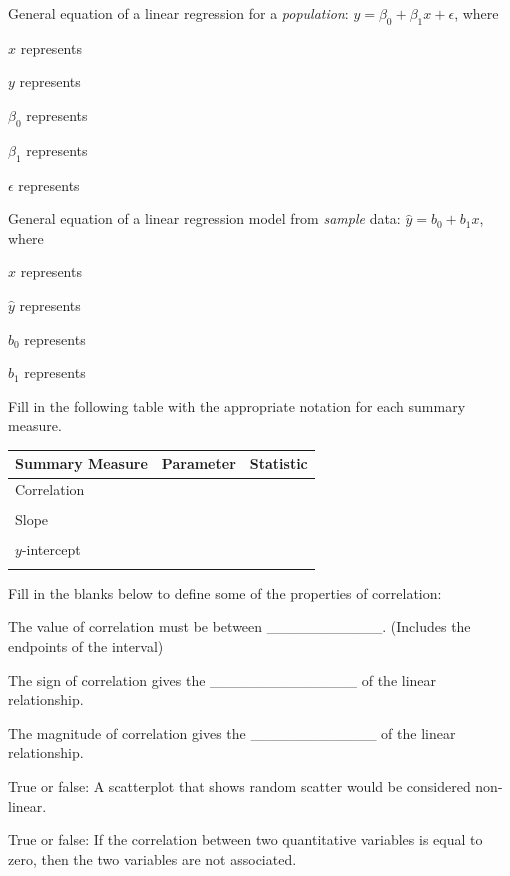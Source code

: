 \documentclass[
]{report}
\newcommand{\rgs}{\vspace{12pt}} %
\newcommand{\rgi}{\hspace{24pt}}  %
\begin{document}
General equation of a linear regression for a \emph{population}: \(y= \beta_0+ \beta_1 x+\epsilon\), where

\rgi \(x\) represents
\rgs

\rgi \(y\) represents
\rgs

\rgi \(\beta_0\) represents
\rgs

\rgi \(\beta_1\) represents
\rgs

\rgi \(\epsilon\) represents
\rgs

General equation of a linear regression model from \emph{sample} data: \(\hat{y}= b_0+ b_1 x\), where

\rgi \(x\) represents
\rgs

\rgi \(\hat{y}\) represents
\rgs

\rgi \(b_0\) represents
\rgs

\rgi \(b_1\) represents
\rgs

Fill in the following table with the appropriate notation for each summary measure.

\begin{center}
\begin{tabular}{|l|p{2in}|p{2in}|} \hline
Summary Measure & Parameter & Statistic \\ \hline
Correlation & & \\ 
& & \\ \hline
Slope & & \\ 
& & \\ \hline
$y$-intercept & & \\ 
& & \\ \hline
\end{tabular}
\end{center}

Fill in the blanks below to define some of the properties of correlation:

\rgi The value of correlation must be between \_\_\_\_\_\_\_\_\_\_\_. (Includes the endpoints of the interval)

\rgi The sign of correlation gives the \_\_\_\_\_\_\_\_\_\_\_\_\_\_ of the linear relationship.

\rgi The magnitude of correlation gives the \_\_\_\_\_\_\_\_\_\_\_\_ of the linear relationship.

True or false: A scatterplot that shows random scatter would be considered non-linear.

True or false: If the correlation between two quantitative variables is equal to zero, then the two variables are not associated.
\end{document}
